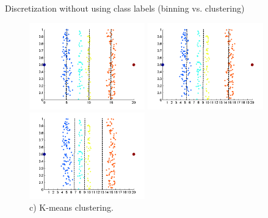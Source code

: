 \documentclass[aspectratio=169,t]{beamer}
\begin{document}
  { 
    \begin{frame}{Discretization without using class labels (binning vs. clustering)}
    \begin{figure}[H]
        \centering
        \begin{minipage}{0.32\textwidth}
            \includegraphics[width=5cm]{img/binningvsclustering2.png}
            \caption{a) Equal interval width (binning).}
        \end{minipage}
        \begin{minipage}{0.32\textwidth}
            \centering
            \includegraphics[width=5cm]{img/binningvsclustering3.png}
            \caption{b) Equal frequency (binning).}
        \end{minipage}
        \begin{minipage}{0.32\textwidth}
            \centering
            \includegraphics[width=5cm]{img/binningvsclustering4.png}
            \caption{c) K-means clustering.}
        \end{minipage}\hfill
    \end{figure} 
    \end{frame}
  }
\end{document}
